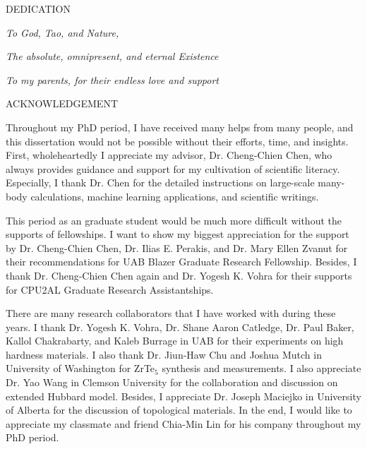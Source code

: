 		
		
		\pagebreak
		{\centering
		\singlespacing
			DEDICATION\par
		}
		\vskip 2in
		{\centering
		
		    \textit{To God, Tao, and Nature,}
		    
		    \textit{The absolute, omnipresent, and eternal Existence}
		    
		    \vskip 0.5in
		    
		    \textit{To my parents, for their endless love and support}

		}
		\restoregeometry
		
		{\centering
		\singlespacing
			ACKNOWLEDGEMENT\par
		}
		\vskip 48pt
        Throughout my PhD period, I have received many helps from many people, and this dissertation would not be possible without their efforts, time, and insights. First, wholeheartedly I appreciate my advisor, Dr. Cheng-Chien Chen, who always provides guidance and support for my cultivation of scientific literacy. Especially, I thank Dr. Chen for the detailed instructions on large-scale many-body calculations, machine learning applications, and scientific writings.
        
        This period as an graduate student would be much more difficult without the supports of fellowships. I want to show my biggest appreciation for the support by Dr. Cheng-Chien Chen, Dr. Ilias E. Perakis, and Dr. Mary Ellen Zvanut for their recommendations for UAB Blazer Graduate Research Fellowship. Besides, I thank Dr. Cheng-Chien Chen again and Dr. Yogesh K. Vohra for their supports for CPU2AL Graduate Research Assistantships.
        
        There are many research collaborators that I have worked with during these years. I thank Dr. Yogesh K. Vohra, Dr. Shane Aaron Catledge, Dr. Paul Baker, Kallol Chakrabarty, and Kaleb Burrage in UAB for their experiments on high hardness materials. I also thank Dr. Jiun-Haw Chu and Joshua Mutch in University of Washington for ZrTe$_5$ synthesis and measurements. I also appreciate Dr. Yao Wang in Clemson University for the collaboration and discussion on extended Hubbard model. Besides, I appreciate Dr. Joseph Maciejko in University of Alberta for the discussion of topological materials. In the end, I would like to appreciate my classmate and friend Chia-Min Lin for his company throughout my PhD period.
    \restoregeometry
    \pagebreak
	
